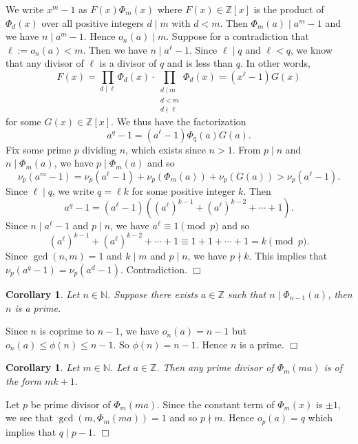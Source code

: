\documentclass{article}
\def\Z{{\mathbb Z}}
\def\N{{\mathbb N}}
\def\Z{{\mathbb Z}}
\newtheorem{cor}[subsection]{Corollary}
\newenvironment{proof}{\noindent {\bf Proof:}}{$\Box$ \vspace{2 ex}}
\begin{document}
\begin{proof}
    We write $x^m - 1$ as $F(x)\Phi_m(x)$ where $F(x)\in\Z[x]$ is the product of $\Phi_d(x)$ over all positive integers $d\mid m$ with $d<m$. Then $\Phi_m(a)\mid a^m - 1$ and we have $n\mid a^m - 1$. Hence $o_n(a)\mid m$.
    Suppose for a contradiction that $\ell:=o_n(a)<m$. Then we have $n\mid a^\ell - 1$.  Since $\ell\mid q$ and $\ell < q$, we know that any divisor of $\ell$ is a divisor of $q$ and is less than $q$. In other words, $$F(x) = \prod_{d\mid \ell}\Phi_d(x)\cdot\prod_{\substack{d\mid m\\ d<m \\ d\nmid\ell}}\Phi_d(x) = (x^\ell - 1)G(x)$$ for some $G(x)\in\Z[x]$. We thus have the factorization
    $$a^q - 1 = (a^\ell - 1)\Phi_q(a)G(a).$$
    Fix some prime $p$ dividing $n$, which exists since $n>1$. From $p\mid n$ and $n\mid \Phi_m(a)$, we have $p\mid\Phi_m(a)$ and so
    $$\nu_p(a^m - 1) = \nu_p(a^\ell - 1) + \nu_p(\Phi_m(a)) + \nu_p(G(a)) > \nu_p(a^\ell - 1).$$
    Since $\ell\mid q$, we write $q = \ell k$ for some positive integer $k$. Then
    $$a^q - 1 = (a^\ell - 1)((a^\ell)^{k-1} + (a^\ell)^{k-2} + \cdots + 1).$$
    Since $n\mid a^\ell-1$ and $p\mid n$, we have $a^\ell\equiv 1\pmod{p}$ and so
    $$(a^\ell)^{k-1} + (a^\ell)^{k-2} + \cdots + 1 \equiv 1+1+\cdots+1 = k\pmod{p}.$$
    Since $\gcd(n,m) = 1$ and $k\mid m$ and $p\mid n$, we have $p\nmid k$. This implies that $\nu_p(a^q - 1) = \nu_p(a^d - 1)$. Contradiction.
\end{proof}

\begin{cor}
    Let $n\in\N$. Suppose there exists $a\in\Z$ such that $n\mid\Phi_{n-1}(a)$, then $n$ is a prime.
\end{cor}

\begin{proof}
    Since $n$ is coprime to $n-1$, we have $o_n(a) = n-1$ but $o_n(a)\leq\phi(n)\leq n - 1$. So $\phi(n) = n - 1$. Hence $n$ is a prime.
\end{proof}

\begin{cor}
    Let $m\in\N$. Let $a\in\Z$. Then any prime divisor of $\Phi_m(ma)$ is of the form $mk+1$.
\end{cor}

\begin{proof}
    Let $p$ be prime divisor of $\Phi_m(ma)$. Since the constant term of $\Phi_m(x)$ is $\pm1$, we see that $\gcd(m,\Phi_m(ma)) = 1$ and so $p\nmid m$. Hence $o_p(a) = q$ which implies that $q\mid p-1$.
\end{proof}
\end{document}
